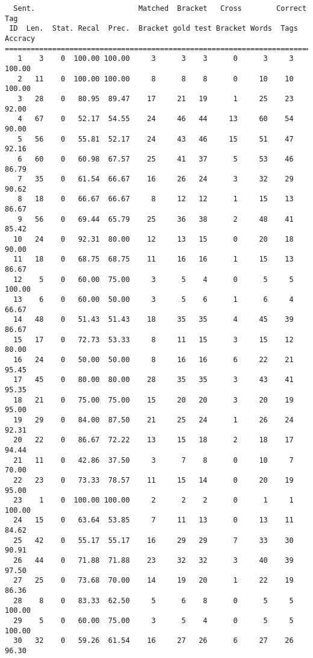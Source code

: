\scriptsize
\begin{verbatim}
  Sent.                        Matched  Bracket   Cross        Correct Tag
 ID  Len.  Stat. Recal  Prec.  Bracket gold test Bracket Words  Tags Accracy
============================================================================
   1    3    0  100.00 100.00     3      3    3      0      3     3   100.00
   2   11    0  100.00 100.00     8      8    8      0     10    10   100.00
   3   28    0   80.95  89.47    17     21   19      1     25    23    92.00
   4   67    0   52.17  54.55    24     46   44     13     60    54    90.00
   5   56    0   55.81  52.17    24     43   46     15     51    47    92.16
   6   60    0   60.98  67.57    25     41   37      5     53    46    86.79
   7   35    0   61.54  66.67    16     26   24      3     32    29    90.62
   8   18    0   66.67  66.67     8     12   12      1     15    13    86.67
   9   56    0   69.44  65.79    25     36   38      2     48    41    85.42
  10   24    0   92.31  80.00    12     13   15      0     20    18    90.00
  11   18    0   68.75  68.75    11     16   16      1     15    13    86.67
  12    5    0   60.00  75.00     3      5    4      0      5     5   100.00
  13    6    0   60.00  50.00     3      5    6      1      6     4    66.67
  14   48    0   51.43  51.43    18     35   35      4     45    39    86.67
  15   17    0   72.73  53.33     8     11   15      3     15    12    80.00
  16   24    0   50.00  50.00     8     16   16      6     22    21    95.45
  17   45    0   80.00  80.00    28     35   35      3     43    41    95.35
  18   21    0   75.00  75.00    15     20   20      3     20    19    95.00
  19   29    0   84.00  87.50    21     25   24      1     26    24    92.31
  20   22    0   86.67  72.22    13     15   18      2     18    17    94.44
  21   11    0   42.86  37.50     3      7    8      0     10     7    70.00
  22   23    0   73.33  78.57    11     15   14      0     20    19    95.00
  23    1    0  100.00 100.00     2      2    2      0      1     1   100.00
  24   15    0   63.64  53.85     7     11   13      0     13    11    84.62
  25   42    0   55.17  55.17    16     29   29      7     33    30    90.91
  26   44    0   71.88  71.88    23     32   32      3     40    39    97.50
  27   25    0   73.68  70.00    14     19   20      1     22    19    86.36
  28    8    0   83.33  62.50     5      6    8      0      5     5   100.00
  29    5    0   60.00  75.00     3      5    4      0      5     5   100.00
  30   32    0   59.26  61.54    16     27   26      6     27    26    96.30

\end{verbatim}
